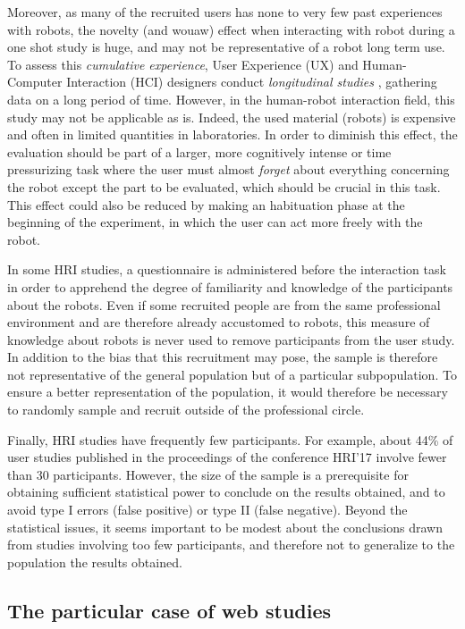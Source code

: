 \documentclass[a4paper,11pt,twoside]{StyleThese}
\begin{document}
Moreover, as many of the recruited users has none to very few past experiences with robots, the novelty (and wouaw) effect when interacting with robot during a one shot study is huge, and may not be representative of a robot long term use. To assess this \textit{cumulative experience}, User Experience (UX) and Human-Computer Interaction (HCI) designers conduct \textit{longitudinal studies} \cite{lazar2017research}, gathering data on a long period of time. However, in the human-robot interaction field, this study may not be applicable as is. Indeed, the used material (robots) is expensive and often in limited quantities in laboratories. In order to diminish this effect, the evaluation should be part of a larger, more cognitively intense or time pressurizing task where the user must almost \textit{forget} about everything concerning the robot except the part to be evaluated, which should be crucial in this task. This effect could also be reduced by making an habituation phase at the beginning of the experiment, in which the user can act more freely with the robot.

In some HRI studies, a questionnaire is administered before the interaction task in order to apprehend the degree of familiarity and knowledge of the participants about the robots. Even if some recruited people are from the same professional environment and are therefore already accustomed to robots, this measure of knowledge about robots is never used to remove participants from the user study. In addition to the bias that this recruitment may pose, the sample is therefore not representative of the general population but of a particular subpopulation. To ensure a better representation of the population, it would therefore be necessary to randomly sample and recruit outside of the professional circle.

Finally, HRI studies have frequently few participants. For example, about 44\% of user studies published in the proceedings of the conference HRI'17 involve fewer than 30 participants. However, the size of the sample is a prerequisite for obtaining sufficient statistical power to conclude on the results obtained, and to avoid type I errors (false positive) or type II (false negative). Beyond the statistical issues, it seems important to be modest about the conclusions drawn from studies involving too few participants, and therefore not to generalize to the population the results obtained.

\subsection*{The particular case of web studies}
\end{document}
